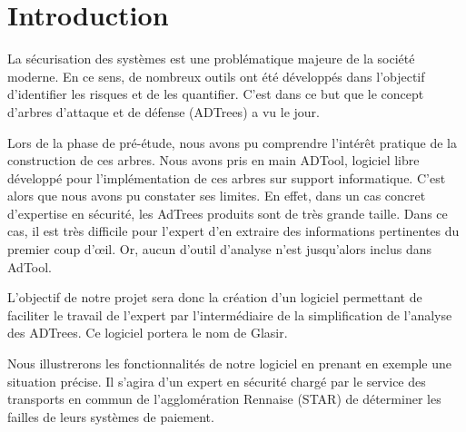 \section{Introduction}
	
	La sécurisation des systèmes est une problématique majeure de la société moderne. En ce sens, de nombreux outils ont été développés dans l'objectif d'identifier les risques et de les quantifier. C'est dans ce but que le concept d'arbres d'attaque et de défense (ADTrees) a vu le jour.
	
	Lors de la phase de pré-étude, nous avons pu comprendre l’intérêt pratique de la construction de ces arbres. Nous avons pris en main ADTool, logiciel libre développé pour l'implémentation de ces arbres sur support informatique. C'est alors que nous avons pu constater ses limites. En effet, dans un cas concret d'expertise en sécurité, les AdTrees produits sont de très grande taille. Dans ce cas, il est très difficile pour l'expert d'en extraire des informations pertinentes du premier coup d’œil. Or, aucun d'outil d'analyse n'est jusqu'alors inclus dans AdTool.

	L'objectif de notre projet sera donc la création d'un logiciel permettant de faciliter le travail de l'expert par l’intermédiaire de la simplification de l'analyse des ADTrees. Ce logiciel portera le nom de Glasir.

	Nous illustrerons les fonctionnalités de notre logiciel en prenant en exemple une situation précise. Il s'agira d'un expert en sécurité chargé par le service des transports en commun de l'agglomération Rennaise (STAR) de déterminer les failles de leurs systèmes de paiement. 













